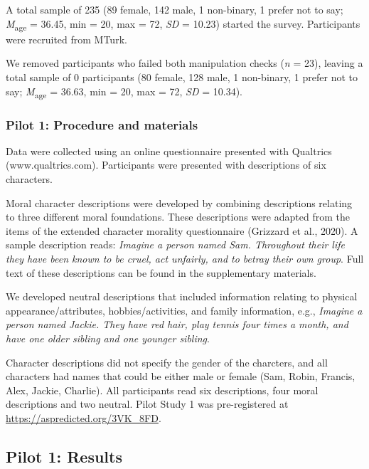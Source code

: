 \documentclass[
  american,
  man,floatsintext]{apa7}
\begin{document}
A total sample of 235 (89 female, 142 male, 1 non-binary, 1 prefer not to say; \emph{M}\textsubscript{age} = 36.45, min = 20, max = 72, \emph{SD} = 10.23) started the survey. Participants were recruited from MTurk.

We removed participants who failed both manipulation checks (\emph{n} = 23), leaving a total sample of 0 participants (80 female, 128 male, 1 non-binary, 1 prefer not to say; \emph{M}\textsubscript{age} = 36.63, min = 20, max = 72, \emph{SD} = 10.34).

\hypertarget{pilot-1-procedure-and-materials}{%
\subsubsection{Pilot 1: Procedure and materials}\label{pilot-1-procedure-and-materials}}

Data were collected using an online questionnaire presented with Qualtrics (www.qualtrics.com). Participants were presented with descriptions of six characters.

Moral character descriptions were developed by combining descriptions relating to three different moral foundations. These descriptions were adapted from the items of the extended character morality questionnaire (Grizzard et al., 2020). A sample description reads: \emph{Imagine a person named Sam. Throughout their life they have been known to be cruel, act unfairly, and to betray their own group}. Full text of these descriptions can be found in the supplementary materials.

We developed neutral descriptions that included information relating to physical appearance/attributes, hobbies/activities, and family information, e.g., \emph{Imagine a person named Jackie. They have red hair, play tennis four times a month, and have one older sibling and one younger sibling}.

Character descriptions did not specify the gender of the charcters, and all characters had names that could be either male or female (Sam, Robin, Francis, Alex, Jackie, Charlie). All participants read six descriptions, four moral descriptions and two neutral. Pilot Study 1 was pre-registered at \color{blue}\url{https://aspredicted.org/3VK_8FD}\color{black}.

\hypertarget{pilot-1-results}{%
\subsection{Pilot 1: Results}\label{pilot-1-results}}
\end{document}
